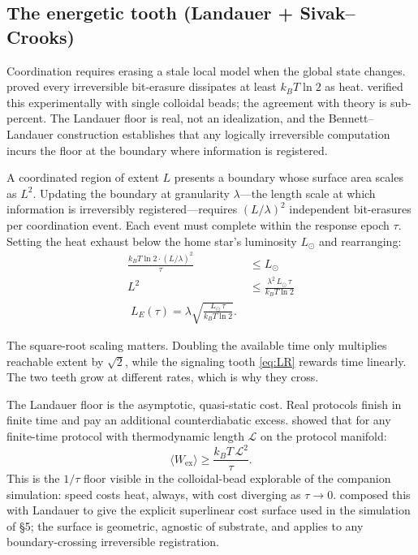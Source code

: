 \documentclass[11pt,twocolumn]{article}
\newcommand{\LE}{L_E}
\newcommand{\kBT}{k_{B}T}
\newcommand{\Lsun}{L_{\odot}}
\begin{document}
\subsection{The energetic tooth (Landauer + Sivak--Crooks)}
\label{sec:Lenergetic}

Coordination requires erasing a stale local model when the global state
changes. \citet{Landauer1961} proved every irreversible bit-erasure
dissipates at least $\kBT \ln 2$ as heat. \citet{Berut2012} verified this
experimentally with single colloidal beads; the agreement with theory is
sub-percent. The Landauer floor is real, not an idealization, and the
Bennett--Landauer construction \citep{Bennett1982} establishes that any
logically irreversible computation incurs the floor at the boundary where
information is registered.

A coordinated region of extent $L$ presents a boundary whose surface area
scales as $L^{2}$. Updating the boundary at granularity $\lambda$—the
length scale at which information is irreversibly registered—requires
$(L/\lambda)^{2}$ independent bit-erasures per coordination event. Each
event must complete within the response epoch $\tau$. Setting the heat
exhaust below the home star's luminosity $\Lsun$ and rearranging:
\begin{align}
\frac{\kBT \ln 2 \cdot (L/\lambda)^{2}}{\tau} &\le \Lsun \\[2pt]
L^{2} &\le \frac{\lambda^{2}\,\Lsun\,\tau}{\kBT \ln 2} \\[2pt]
\boxed{\;\LE(\tau) = \lambda\sqrt{\frac{\Lsun\,\tau}{\kBT \ln 2}}.\;}
\label{eq:LE}
\end{align}

The square-root scaling matters. Doubling the available time only
multiplies reachable extent by $\sqrt{2}$, while the signaling tooth
\eqref{eq:LR} rewards time linearly. The two teeth grow at different
rates, which is why they cross.

The Landauer floor is the asymptotic, quasi-static cost. Real protocols
finish in finite time and pay an additional counterdiabatic excess.
\citet{SivakCrooks2012} showed that for any finite-time protocol with
thermodynamic length $\mathcal{L}$ on the protocol manifold:
\begin{equation}
\langle W_{\text{ex}}\rangle \ge \frac{\kBT\,\mathcal{L}^{2}}{\tau}.
\label{eq:sivakcrooks}
\end{equation}
This is the $1/\tau$ floor visible in the colloidal-bead explorable of the
companion simulation: speed costs heat, always, with cost diverging as
$\tau \to 0$. \citet{Boyd2022} composed this with Landauer to give the
explicit superlinear cost surface used in the simulation of \S 5; the
surface is geometric, agnostic of substrate, and applies to any
boundary-crossing irreversible registration.
\end{document}
